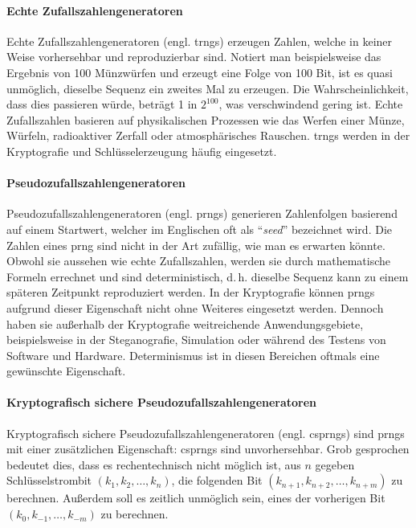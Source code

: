 \paragraph{Echte Zufallszahlengeneratoren}
Echte Zufallszahlengeneratoren (engl. \acp{trng})
erzeugen Zahlen, welche in keiner Weise vorhersehbar und reproduzierbar sind. Notiert man
beispielsweise das Ergebnis von 100 Münzwürfen und erzeugt eine Folge von 100 Bit, ist es quasi
unmöglich, dieselbe Sequenz ein zweites Mal zu erzeugen. Die Wahrscheinlichkeit,
dass dies passieren würde, beträgt 1 in $2^{100}$, was verschwindend gering ist.
Echte Zufallszahlen basieren auf physikalischen Prozessen wie das Werfen einer Münze, Würfeln,
radioaktiver Zerfall oder atmosphärisches Rauschen. \acp{trng} werden in der Kryptografie und
Schlüsselerzeugung häufig eingesetzt.

\paragraph{Pseudozufallszahlengeneratoren}
Pseudozufallszahlengeneratoren (engl. \acp{prng})
generieren Zahlenfolgen basierend auf einem Startwert, welcher im Englischen oft als
\enquote{\textit{seed}} bezeichnet wird. Die Zahlen eines \ac{prng} sind nicht
in der Art zufällig, wie man es erwarten könnte.
Obwohl sie aussehen wie echte Zufallszahlen, werden sie durch
mathematische Formeln errechnet und sind deterministisch, d.\,h. dieselbe Sequenz
kann zu einem späteren Zeitpunkt reproduziert werden.
In der Kryptografie können \acp{prng} aufgrund dieser Eigenschaft
nicht ohne Weiteres eingesetzt werden.
Dennoch haben sie außerhalb der Kryptografie weitreichende Anwendungsgebiete,
beispielsweise in der Steganografie, Simulation oder während des Testens von Software und Hardware.
Determinismus ist in diesen Bereichen oftmals eine gewünschte Eigenschaft.

\paragraph{Kryptografisch sichere Pseudozufallszahlengeneratoren}
Kryptografisch sichere Pseudozufallszahlengeneratoren
(engl. \acp{csprng}) sind \acp{prng} mit
einer zusätzlichen Eigenschaft: \acp{csprng} sind unvorhersehbar. Grob gesprochen
bedeutet dies, dass es rechentechnisch nicht möglich ist, aus $n$ gegeben Schlüsselstrombit
$(k_1,k_2,\dots,k_n)$, die folgenden Bit $(k_{n+1},k_{n+2},\dots,k_{n+m})$ zu berechnen. Außerdem
soll es zeitlich unmöglich sein, eines der vorherigen Bit
$(k_{0},k_{-1},\allowbreak\dots,k_{-m})$ zu berechnen.

